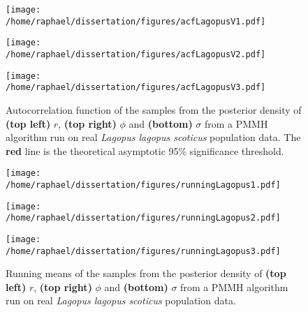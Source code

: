 \documentclass[12pt]{article}
\begin{document}
	\begin{figure}[htb]
		\centering
		\begin{minipage}{0.4\textwidth}
			\centering
			\texttt{[image: /home/raphael/dissertation/figures/acfLagopusV1.pdf]}
		\end{minipage}
		\begin{minipage}{0.4\textwidth}
			\centering
			\texttt{[image: /home/raphael/dissertation/figures/acfLagopusV2.pdf]}
		\end{minipage}
		\begin{minipage}{0.4\textwidth}
			\centering
			\texttt{[image: /home/raphael/dissertation/figures/acfLagopusV3.pdf]}
		\end{minipage}
		\caption[Autocorrelation functions of the samples from a PMMH algorithm run on real \emph{Lagopus lagopus scoticus} population data]{Autocorrelation function of the samples from the posterior density of \textbf{(top left)} $r$, \textbf{(top right)} $\phi$ and \textbf{(bottom)} $\sigma$ from a PMMH algorithm run on real \emph{Lagopus lagopus scoticus} population data. The \textbf{red} line is the theoretical asymptotic 95\% significance threshold.}
		\label{fig:acfLagopus}
	\end{figure}
	
	\begin{figure}[htb]
		\centering
		\begin{minipage}{0.4\textwidth}
			\centering
			\texttt{[image: /home/raphael/dissertation/figures/runningLagopus1.pdf]}
		\end{minipage}
		\begin{minipage}{0.4\textwidth}
			\centering
			\texttt{[image: /home/raphael/dissertation/figures/runningLagopus2.pdf]}
		\end{minipage}
		\begin{minipage}{0.4\textwidth}
			\centering
			\texttt{[image: /home/raphael/dissertation/figures/runningLagopus3.pdf]}
		\end{minipage}
		\caption[Running means of the samples from a PMMH algorithm run on real \emph{Lagopus lagopus scoticus} population data]{Running means of the samples from the posterior density of \textbf{(top left)} $r$, \textbf{(top right)} $\phi$ and \textbf{(bottom)} $\sigma$ from a PMMH algorithm run on real \emph{Lagopus lagopus scoticus} population data.}
		\label{fig:rmLagopus}
	\end{figure}
	
\end{document}
